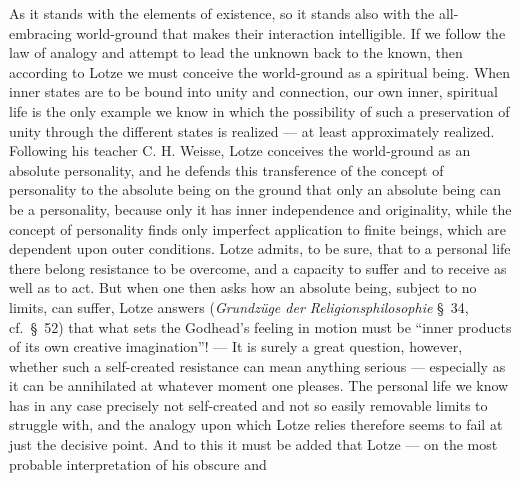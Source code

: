 \documentclass[12pt,a4paper]{book}
\newcommand{\opage}[1]{\marginnote{\footnotesize\textit{[#1]}}}
\begin{document}
As it stands with the elements of existence, so it stands also with the
all-embracing world-ground that makes their interaction intelligible. If we
follow the law of analogy and attempt to lead the unknown back to the known, then
according to Lotze we must conceive the world-ground as a spiritual being. When
inner states are to be bound into unity and connection, our own inner, spiritual
life is the only example we know in which the possibility of such a preservation
of unity through the different states is realized --- at least approximately
realized. Following his teacher C. H. Weisse, Lotze conceives the world-ground as
an absolute personality, and he defends this transference of the concept of
personality to the absolute being on the ground that only an absolute being can
be a personality, because only it has inner independence and originality, while
the concept of personality finds only imperfect application to finite beings,
which are dependent upon outer conditions. Lotze admits, to be sure, that to a
personal life there belong resistance to be overcome, and a capacity to suffer
and to receive as well as to act. But when one then asks how an absolute \opage{520}being,
subject to no limits, can suffer, Lotze answers (\textit{Grundzüge der
Religionsphilosophie} §~34, cf.\ §~52) that what sets the Godhead's feeling in
motion must be ``inner products of its own creative imagination''! --- It is
surely a great question, however, whether such a self-created resistance can mean
anything serious --- especially as it can be annihilated at whatever moment one
pleases. The personal life we know has in any case precisely not self-created and
not so easily removable limits to struggle with, and the analogy upon which Lotze
relies therefore seems to fail at just the decisive point. And to this it must be
added that Lotze --- on the most probable interpretation of his obscure and
\end{document}
